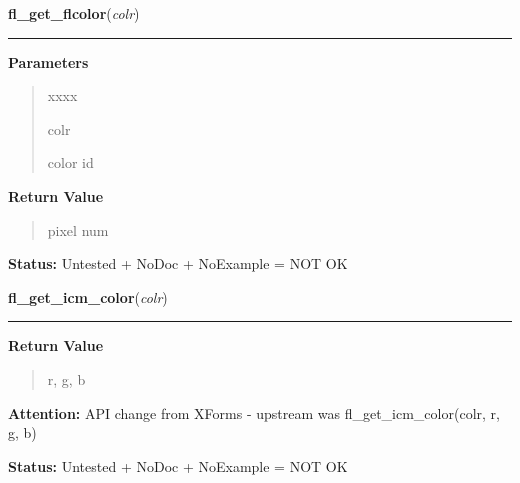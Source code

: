 \hspace{.8\funcindent}\begin{boxedminipage}{\funcwidth}

    \raggedright \textbf{fl\_get\_flcolor}(\textit{colr})

    \vspace{-1.5ex}

    \rule{\textwidth}{0.5\fboxrule}
\setlength{\parskip}{2ex}
\setlength{\parskip}{1ex}
      \textbf{Parameters}
      \vspace{-1ex}

      \begin{quote}
        \begin{Ventry}{xxxx}

          \item[colr]

          color id

        \end{Ventry}

      \end{quote}

      \textbf{Return Value}
    \vspace{-1ex}

      \begin{quote}
      pixel num

      \end{quote}

\textbf{Status:} Untested + NoDoc + NoExample = NOT OK



    \end{boxedminipage}

    \label{xformslib:library:fl_get_icm_color}

    \vspace{0.5ex}

\hspace{.8\funcindent}\begin{boxedminipage}{\funcwidth}

    \raggedright \textbf{fl\_get\_icm\_color}(\textit{colr})

    \vspace{-1.5ex}

    \rule{\textwidth}{0.5\fboxrule}
\setlength{\parskip}{2ex}
\setlength{\parskip}{1ex}
      \textbf{Return Value}
    \vspace{-1ex}

      \begin{quote}
      r, g, b

      \end{quote}

\textbf{Attention:} API change from XForms - upstream was fl\_get\_icm\_color(colr, r, g, b)



\textbf{Status:} Untested + NoDoc + NoExample = NOT OK



    \end{boxedminipage}

